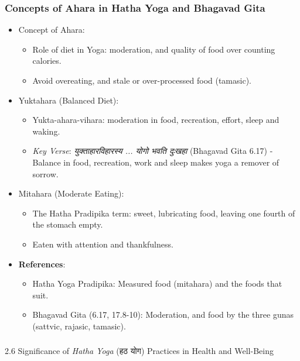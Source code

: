 \begin{frame}[fragile]\frametitle{Concepts of Ahara in Hatha Yoga and Bhagavad Gita}

\begin{itemize}
    \item Concept of Ahara:
        \begin{itemize}
            \item Role of diet in Yoga: moderation, and quality of food over counting calories.
            \item Avoid overeating, and stale or over-processed food (tamasic).
        \end{itemize}
    \item Yuktahara (Balanced Diet):
        \begin{itemize}
            \item Yukta-ahara-vihara: moderation in food, recreation, effort, sleep and waking.
            \item \textit{Key Verse}: \textit{युक्ताहारविहारस्य ... योगो भवति दुःखहा} (Bhagavad Gita 6.17) - Balance in food, recreation, work and sleep makes yoga a remover of sorrow.
        \end{itemize}
    \item Mitahara (Moderate Eating):
        \begin{itemize}
            \item The Hatha Pradipika term: sweet, lubricating food, leaving one fourth of the stomach empty.
            \item Eaten with attention and thankfulness.
        \end{itemize}
\end{itemize}
\begin{itemize}
    \item \textbf{References}:
        \begin{itemize}
            \item Hatha Yoga Pradipika: Measured food (mitahara) and the foods that suit.
            \item Bhagavad Gita (6.17, 17.8-10): Moderation, and food by the three gunas (sattvic, rajasic, tamasic).
        \end{itemize}
\end{itemize}

\end{frame}

\begin{frame}[fragile]\frametitle{}
\begin{center}
{\Large 2.6  Significance of \textit{Hatha Yoga} (हठ योग) Practices in Health and Well-Being}
\end{center}
\end{frame}

